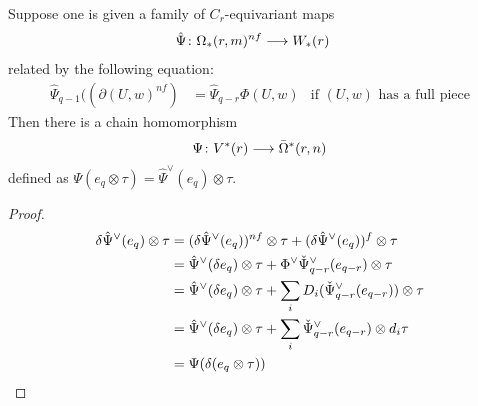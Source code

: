 \begin{lemma} \label{lemma:omegarm}
	Suppose one is given a family of $C_r$-equivariant maps
	\begin{align*}
		\hat{\Psi}\colon \Omega_*(r,m)^{nf}&\longrightarrow W_*(r)
	\end{align*}
	related by the following equation:
	\begin{align}\label{it:1a}
		\hat{\Psi}_{q-1}((\partial (U,w)^{nf}) &= \hat{\Psi}_{q-r}\Phi(U,w) &\text{if $(U,w)$ has a full piece}
	\end{align}
	Then there is a chain homomorphism
	\[\Psi\colon V^*(r)\longrightarrow \bar{\Omega}^*(r,n)\]
	defined as $\Psi(e_q\otimes \tau) = \hat{\Psi}^\vee(e_q)\otimes \tau$.
\end{lemma}

\begin{proof}
	\begin{align*}
		\delta\hat{\Psi}^{\vee}(e_q)\otimes \tau
		&= (\delta\hat{\Psi}^{\vee}(e_q))^{nf}\otimes\tau + (\delta\hat{\Psi}^{\vee}(e_q))^f\otimes\tau \\
		&= \hat{\Psi}^{\vee}(\delta e_q)\otimes \tau + \Phi^\vee\check{\Psi}^\vee_{q-r}(e_{q-r})\otimes\tau \\
		&= \hat{\Psi}^{\vee}(\delta e_{q})\otimes \tau + \sum_i D_i(\check{\Psi}^\vee_{q-r}(e_{q-r}))\otimes \tau\\
		&= \hat{\Psi}^{\vee}(\delta e_q)\otimes \tau + \sum_i \check{\Psi}^\vee_{q-r}(e_{q-r})\otimes d_i\tau \\
		&= \Psi(\delta(e_q\otimes \tau))\qedhere
	\end{align*}
\end{proof}

